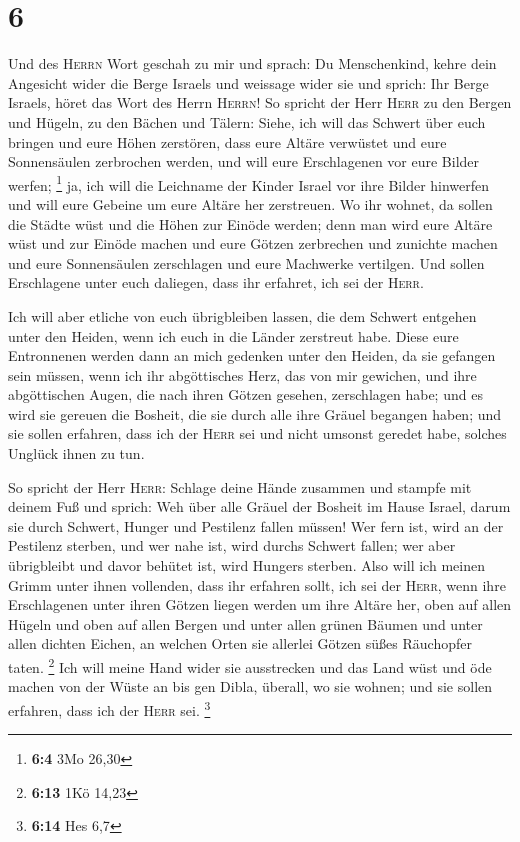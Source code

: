 \hypertarget{section-2}{%
\section{6}\label{section-2}}

 Und des \textsc{Herrn} Wort geschah zu mir und sprach:
 Du Menschenkind, kehre dein Angesicht wider die Berge
Israels und weissage wider sie  und sprich: Ihr Berge
Israels, höret das Wort des Herrn \textsc{Herrn}! So spricht der Herr
\textsc{Herr} zu den Bergen und Hügeln, zu den Bächen und Tälern: Siehe,
ich will das Schwert über euch bringen und eure Höhen zerstören,
 dass eure Altäre verwüstet und eure Sonnensäulen
zerbrochen werden, und will eure Erschlagenen vor eure Bilder werfen;
\footnote{\textbf{6:4} 3Mo 26,30}  ja, ich will die
Leichname der Kinder Israel vor ihre Bilder hinwerfen und will eure
Gebeine um eure Altäre her zerstreuen.  Wo ihr wohnet, da
sollen die Städte wüst und die Höhen zur Einöde werden; denn man wird
eure Altäre wüst und zur Einöde machen und eure Götzen zerbrechen und
zunichte machen und eure Sonnensäulen zerschlagen und eure Machwerke
vertilgen.  Und sollen Erschlagene unter euch daliegen,
dass ihr erfahret, ich sei der \textsc{Herr}.

 Ich will aber etliche von euch übrigbleiben lassen, die
dem Schwert entgehen unter den Heiden, wenn ich euch in die Länder
zerstreut habe.  Diese eure Entronnenen werden dann an
mich gedenken unter den Heiden, da sie gefangen sein müssen, wenn ich
ihr abgöttisches Herz, das von mir gewichen, und ihre abgöttischen
Augen, die nach ihren Götzen gesehen, zerschlagen habe; und es wird sie
gereuen die Bosheit, die sie durch alle ihre Gräuel begangen haben;
 und sie sollen erfahren, dass ich der \textsc{Herr} sei
und nicht umsonst geredet habe, solches Unglück ihnen zu tun.

 So spricht der Herr \textsc{Herr}: Schlage deine Hände
zusammen und stampfe mit deinem Fuß und sprich: Weh über alle Gräuel der
Bosheit im Hause Israel, darum sie durch Schwert, Hunger und Pestilenz
fallen müssen!  Wer fern ist, wird an der Pestilenz
sterben, und wer nahe ist, wird durchs Schwert fallen; wer aber
übrigbleibt und davor behütet ist, wird Hungers sterben. Also will ich
meinen Grimm unter ihnen vollenden,  dass ihr erfahren
sollt, ich sei der \textsc{Herr}, wenn ihre Erschlagenen unter ihren
Götzen liegen werden um ihre Altäre her, oben auf allen Hügeln und oben
auf allen Bergen und unter allen grünen Bäumen und unter allen dichten
Eichen, an welchen Orten sie allerlei Götzen süßes Räuchopfer taten.
\footnote{\textbf{6:13} 1Kö 14,23}  Ich will meine Hand
wider sie ausstrecken und das Land wüst und öde machen von der Wüste an
bis gen Dibla, überall, wo sie wohnen; und sie sollen erfahren, dass ich
der \textsc{Herr} sei. \footnote{\textbf{6:14} Hes 6,7}

